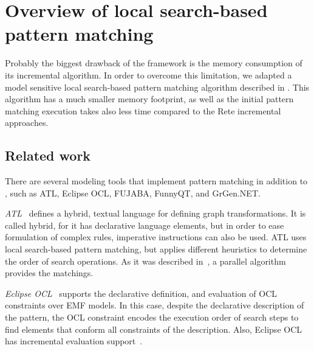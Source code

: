 \chapter{Overview of local search-based pattern matching}
\label{chap:overview}


Probably the biggest drawback of the \eiq framework is the memory consumption of its incremental algorithm. In order to overcome this limitation, we adapted a model sensitive local search-based pattern matching algorithm described in \cite{DBLP:journals/sosym/VarroDWS15}. This algorithm has a much smaller memory footprint, as well as the initial pattern matching execution takes also less time compared to the Rete incremental approaches.


\section{Related work}
\label{sec:relatedwork}

There are several modeling tools that implement pattern matching in addition to \eiq, such as ATL, Eclipse OCL, FUJABA, FunnyQT, and GrGen.NET. 

\emph{ATL}~\cite{DBLP:conf/uml/JouaultK05} defines a hybrid, textual language for defining graph transformations. It is called hybrid, for it has declarative language elements, but in order to ease formulation of complex rules, imperative instructions can also be used. ATL uses local search-based pattern matching, but applies different heuristics to determine the order of search operations. As it was described in~\cite{DBLP:conf/models/TisiPC13}, a parallel algorithm provides the matchings. %

\emph{Eclipse OCL}~\cite{eclipse:ocl} supports the declarative definition, and evaluation of OCL~\cite{OCL:Spec} constraints over EMF models. In this case, despite the declarative description of the pattern, the OCL constraint encodes the execution order of search steps to find elements that conform all constraints of the description. Also, Eclipse OCL has incremental evaluation support~\cite{DBLP:journals/jss/CabotT09}.


